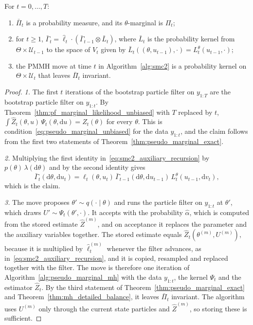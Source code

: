 \begin{proposition}
    \label{prop:smc2_extended_targets}
    For $t=0,\ldots,T$:
    \begin{enumerate}
        \item $\bar{\Pi}_t$ is a probability measure, and its $\theta$-marginal is $\Pi_t$;
        \item for $t\ge1$, $\bar{\Gamma}_t = \hat{\ell}_t\cdot\left(\bar{\Gamma}_{t-1}\otimes\bar{L}_t\right)$, where $\bar{L}_t$ is the probability kernel from $\Theta\times\mathcal{U}_{t-1}$ to the space of $V_t$ given by $\bar{L}_t((\theta,u_{t-1}),\cdot) = L_t^\theta(u_{t-1},\cdot)$;
        \item the PMMH move at time $t$ in Algorithm~\ref{alg:smc2} is a probability kernel on $\Theta\times\mathcal{U}_t$ that leaves $\bar{\Pi}_t$ invariant.
    \end{enumerate}
\end{proposition}
\begin{proof}
    \emph{1.} The first $t$ iterations of the bootstrap particle filter on $y_{1:T}$ are the bootstrap particle filter on $y_{1:t}$. By Theorem~\ref{thm:pf_marginal_likelihood_unbiased} with $T$ replaced by $t$, $\int\hat{Z}_t(\theta,u)\,\Psi_t(\theta,\mathrm{d}u) = Z_t(\theta)$ for every $\theta$. This is condition~\eqref{eq:pseudo_marginal_unbiased} for the data $y_{1:t}$, and the claim follows from the first two statements of Theorem~\ref{thm:pseudo_marginal_exact}.

    \emph{2.} Multiplying the first identity in~\eqref{eq:smc2_auxiliary_recursion} by $p(\theta)\,\lambda(\mathrm{d}\theta)$ and by the second identity gives
    \begin{equation}
        \bar{\Gamma}_t(\mathrm{d}\theta,\mathrm{d}u_t) = \hat{\ell}_t(\theta,u_t)\,\bar{\Gamma}_{t-1}(\mathrm{d}\theta,\mathrm{d}u_{t-1})\,L_t^\theta(u_{t-1},\mathrm{d}v_t),
    \end{equation}
    which is the claim.

    \emph{3.} The move proposes $\theta'\sim q(\cdot\mid\theta)$ and runs the particle filter on $y_{1:t}$ at $\theta'$, which draws $U'\sim\Psi_t(\theta',\cdot)$. It accepts with the probability $\hat{\alpha}$, which is computed from the stored estimate $\hat{Z}^{(m)}$, and on acceptance it replaces the parameter and the auxiliary variables together. The stored estimate equals $\hat{Z}_t(\theta^{(m)},U^{(m)})$, because it is multiplied by $\hat{\ell}_t^{(m)}$ whenever the filter advances, as in~\eqref{eq:smc2_auxiliary_recursion}, and it is copied, resampled and replaced together with the filter. The move is therefore one iteration of Algorithm~\ref{alg:pseudo_marginal_mh} with the data $y_{1:t}$, the kernel $\Psi_t$ and the estimator $\hat{Z}_t$. By the third statement of Theorem~\ref{thm:pseudo_marginal_exact} and Theorem~\ref{thm:mh_detailed_balance}, it leaves $\bar{\Pi}_t$ invariant. The algorithm uses $U^{(m)}$ only through the current state particles and $\hat{Z}^{(m)}$, so storing these is sufficient.
\end{proof}

